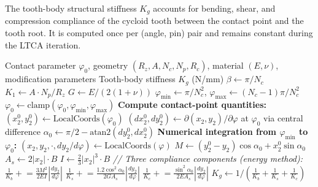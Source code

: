 \documentclass{article}
\begin{document}
The tooth-body structural stiffness $K_g$ accounts for bending, shear, and compression compliance of the cycloid tooth between the contact point and the tooth root. It is computed once per (angle, pin) pair and remains constant during the LTCA iteration.

\begin{algorithm}[t]
\caption{Energy-Method Tooth-Body Stiffness $K_g$}\label{alg:stiffness}
\begin{algorithmic}[1]
\Require Contact parameter $\varphi_0$, geometry $(R_z, A, N_c, N_p, R_c)$, material $(E, \nu)$, modification parameters
\Ensure Tooth-body stiffness $K_g$ (N/mm)
\State $\beta \gets \pi / N_c$ 
\State $K_1 \gets A \cdot N_p / R_z$ 
\State $G \gets E / (2(1+\nu))$ 
\State $\varphi_\text{min} \gets \pi / N_c^2$, \quad $\varphi_\text{max} \gets (N_c - 1)\pi / N_c^2$
\State $\varphi_0 \gets \text{clamp}(\varphi_0, \varphi_\text{min}, \varphi_\text{max})$
\Statex
\State \textbf{Compute contact-point quantities:}
\State $(x_2^0, y_2^0) \gets \text{LocalCoords}(\varphi_0)$ 
\State $(dx_2^0, dy_2^0) \gets \partial(x_2, y_2)/\partial\varphi$ at $\varphi_0$ via central difference
\State $\alpha_0 \gets \pi/2 - \text{atan2}(dy_2^0, dx_2^0)$ 
\Statex
\State \textbf{Numerical integration from $\varphi_\text{min}$ to $\varphi_0$:}
    \State $(x_2, y_2, \cdot, dy_2/d\varphi) \gets \text{LocalCoords}(\varphi)$
    \State $M \gets (y_2^0 - y_2)\cos\alpha_0 + x_2^0 \sin\alpha_0$ 
    \State $A_s \gets 2|x_2| \cdot B$ 
    \State $I \gets \frac{2}{3}|x_2|^3 \cdot B$ 
    \Statex \hspace{2.5em} \textit{// Three compliance components (energy method):}
    \State $\frac{1}{K_b} \mathrel{+}= \frac{3 M^2}{2 E I} \left|\frac{dy_2}{d\varphi}\right|$ 
    \State $\frac{1}{K_s} \mathrel{+}= \frac{1.2 \cos^2\alpha_0}{2 G A_s} \left|\frac{dy_2}{d\varphi}\right|$ 
    \State $\frac{1}{K_c} \mathrel{+}= \frac{\sin^2\alpha_0}{2 E A_s} \left|\frac{dy_2}{d\varphi}\right|$ 
\EndFor
\Statex
\State $K_g \gets 1 \Big/ \left( \frac{1}{K_b} + \frac{1}{K_s} + \frac{1}{K_c} \right)$
\end{algorithmic}
\end{algorithm}
\end{document}
